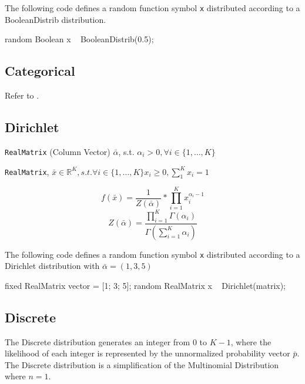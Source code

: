 The following code defines a random function symbol \verb|x| distributed according to a BooleanDistrib distribution.
\begin{blogcode}
random Boolean x ~ BooleanDistrib(0.5);
\end{blogcode}

\subsection{Categorical}
Refer to .

\subsection{Dirichlet}

\begin{itemize*}
\item[] \verb|RealMatrix| (Column Vector) $\bar{\alpha}$, s.t. $\alpha_{i} > 0, \forall i \in \{1, \ldots, K\}$
\end{itemize*}

\begin{itemize*}
\item[] \verb|RealMatrix|, $\bar{x} \in \mathbb{R}^{K}, s.t. \forall i \in \{1, \ldots, K\} x_{i} \geq 0, \sum_{1}^{K} x_{i} = 1 $
\end{itemize*}

\[
	f(\bar{x}) = \frac{1}{Z(\bar{\alpha})} * \prod_{i=1}^{K} x_{i}^{\alpha_{i} - 1}
\]
\[ Z(\bar{\alpha}) = \frac{ \prod_{i=1}^{K} \Gamma(\alpha_{i})   }{ \Gamma(\sum_{i=1}^{K} \alpha_{i} )  }
\]

The following code defines a random function symbol \verb|x| distributed according to a Dirichlet distribution with $\bar{\alpha} = (1, 3, 5) $
\begin{blogcode}
fixed RealMatrix vector = [1; 3; 5];
random RealMatrix x ~ Dirichlet(matrix);
\end{blogcode}

\subsection{Discrete}
The Discrete distribution generates an integer from $0$ to $K-1$, where the likelihood of each integer is represented by the unnormalized probability vector $\bar{p}$. The Discrete distribution is a simplification of the Multinomial Distribution where $n=1$.

